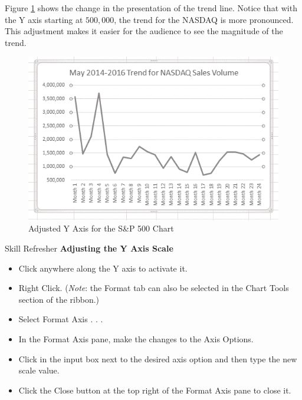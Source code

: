 Figure \ref{04:fig06} shows the change in the presentation of the trend line. Notice that with the Y axis starting at $ 500,000 $, the trend for the NASDAQ is more pronounced. This adjustment makes it easier for the audience to see the magnitude of the trend.

\begin{figure}[H]
	\centering
	\includegraphics[width=\maxwidth{.95\linewidth}]{gfx/ch04_fig06}
	\caption{Adjusted Y Axis for the S\&P 500 Chart}
	\label{04:fig06}
\end{figure}

\begin{center}
	\begin{sklbox}{Skill Refresher}
		\textbf{Adjusting the Y Axis Scale}
		\\
		\begin{itemize}
			\setlength{\itemsep}{0pt}
			\setlength{\parskip}{0pt}
			\setlength{\parsep}{0pt}

			\item Click anywhere along the Y axis to activate it.
			\item Right Click. (\textit{Note}: the Format tab can also be selected in the Chart Tools section of the ribbon.)
			\item Select Format Axis . . .
			\item In the Format Axis pane, make the changes to the Axis Options.
			\item Click in the input box next to the desired axis option and then type the new scale value.
			\item Click the Close button at the top right of the Format Axis pane to close it.
			
		\end{itemize}
	\end{sklbox}
\end{center}

